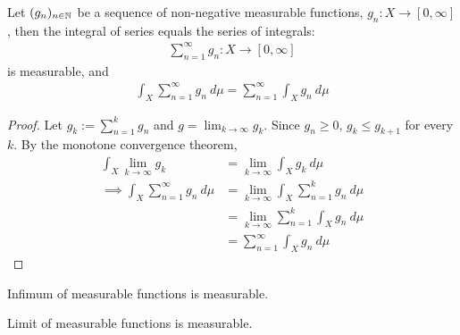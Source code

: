\documentclass[11pt]{article}
\begin{document}
	\begin{corollary}
		Let $(g_n)_{n \in \mathbb{N}}$ be a sequence of non-negative measurable functions, $g_n: X \to [0, \infty]$, then the integral of series equals the series of integrals:
		\begin{align}
			\sum_{n=1}^\infty g_n: X \to [0, \infty]
		\end{align}
		is measurable, and
		\begin{align}
			\int_X \sum_{n=1}^\infty g_n\ d\mu = \sum_{n=1}^\infty \int_X g_n\ d\mu
		\end{align}
	\end{corollary}
	
	\begin{proof}
		Let $g_k := \sum_{n=1}^k g_n$ and $g = \lim_{k \to \infty} g_k$. Since $g_n \geq 0$, $g_k \leq g_{k+1}$ for every $k$. By the monotone convergence theorem,
		\begin{align}
			\int_X \lim_{k\to\infty} g_k &= \lim_{k\to \infty} \int_X g_k\ d\mu \\
			\implies \int_X \sum_{n=1}^\infty g_n\ d\mu &= \lim_{k \to \infty} \int_X \sum_{n=1}^k  g_n\ d\mu \\
			&= \lim_{k \to \infty} \sum_{n=1}^k \int_X g_n\ d\mu \\
			&= \sum_{n=1}^\infty \int_X g_n\ d\mu
		\end{align}
	\end{proof}
	
	\begin{proposition}
		Infimum of measurable functions is measurable.
	\end{proposition}
	
	\begin{proposition}
		Limit of measurable functions is measurable.
	\end{proposition}
\end{document}

